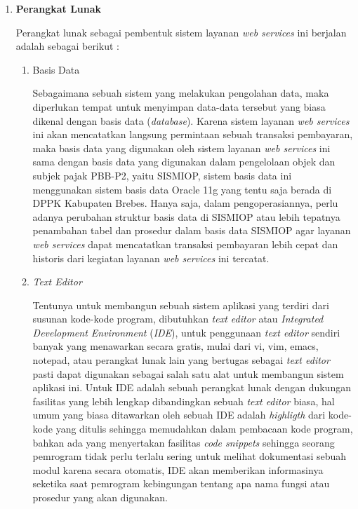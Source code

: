 \documentclass[pdftex,12pt, oneside]{article}
\begin{document}
\begin{enumerate}

\item \textbf{Perangkat Lunak}

Perangkat lunak sebagai pembentuk sistem layanan \textit{web services} ini berjalan adalah sebagai berikut :

\begin{enumerate}
  \item Basis Data
  
  Sebagaimana sebuah sistem yang melakukan pengolahan data, maka diperlukan tempat untuk menyimpan data-data tersebut yang biasa dikenal dengan basis data (\textit{database}). Karena sistem layanan \textit{web services} ini akan mencatatkan langsung permintaan sebuah transaksi pembayaran, maka basis data yang digunakan oleh sistem layanan \textit{web services} ini sama dengan basis data yang digunakan dalam pengelolaan objek dan subjek pajak PBB-P2, yaitu SISMIOP, sistem basis data ini menggunakan sistem basis data Oracle 11g yang tentu saja berada di DPPK Kabupaten Brebes. Hanya saja, dalam pengoperasiannya, perlu adanya perubahan struktur basis data di SISMIOP atau lebih tepatnya penambahan tabel dan prosedur dalam basis data SISMIOP agar layanan \textit{web services} dapat mencatatkan transaksi pembayaran lebih cepat dan historis dari kegiatan layanan \textit{web services} ini tercatat.
  
  \item \textit{Text Editor}
  
  Tentunya untuk membangun sebuah sistem aplikasi yang terdiri dari susunan kode-kode program, dibutuhkan \textit{text editor} atau \textit{Integrated Development Environment} (\textit{IDE}), untuk penggunaan \textit{text editor} sendiri banyak yang menawarkan secara gratis, mulai dari vi, vim, emacs, notepad, atau perangkat lunak lain yang bertugas sebagai \textit{text editor} pasti dapat digunakan sebagai salah satu alat untuk membangun sistem aplikasi ini. Untuk IDE adalah sebuah perangkat lunak dengan dukungan fasilitas yang lebih lengkap dibandingkan sebuah \textit{text editor} biasa, hal umum yang biasa ditawarkan oleh sebuah IDE adalah \textit{highligth} dari kode-kode yang ditulis sehingga memudahkan dalam pembacaan kode program, bahkan ada yang menyertakan fasilitas \textit{code snippets} sehingga seorang pemrogram tidak perlu terlalu sering untuk melihat dokumentasi sebuah modul karena secara otomatis, IDE akan memberikan informasinya seketika saat pemrogram kebingungan tentang apa nama fungsi atau prosedur  yang akan digunakan.
  

\end{enumerate}
\end{enumerate}
\end{document}
